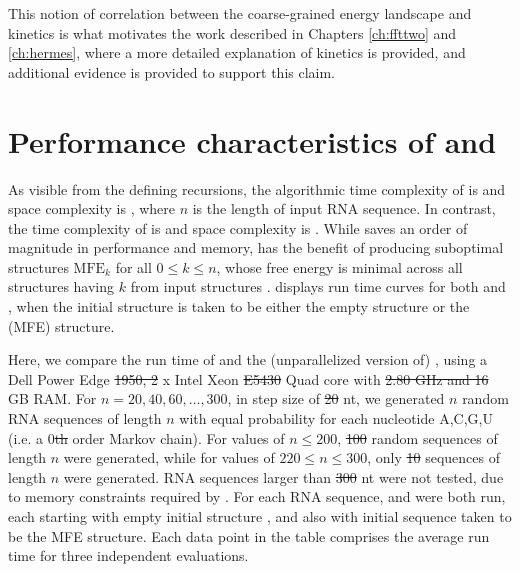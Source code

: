 \documentclass[11pt, oneside]{Thesis} %
\providecommand{\DIFadd}[1]{{\protect\color{blue}\uwave{#1}}} %
\providecommand{\DIFdel}[1]{{\protect\color{red}\sout{#1}}}                      %
\providecommand{\DIFaddbegin}{} %
\providecommand{\DIFaddend}{} %
\providecommand{\DIFdelbegin}{} %
\providecommand{\DIFdelend}{} %
\begin{document}
This notion of correlation between the coarse-grained energy landscape and
kinetics is what motivates the work described in Chapters \ref{ch:ffttwo}
and \ref{ch:hermes}, where a more detailed explanation of kinetics is provided,
and additional evidence is provided to support this claim.

\section{Performance characteristics of \fftbor and \rnabor}
\label{sec:fftbor:speed}

As visible from the defining recursions, the algorithmic time complexity of
\rnabor is  and space complexity is , where $n$ is
the length of input RNA sequence. In contrast, the time complexity of
\fftbor is  and space complexity is .
While \fftbor saves an order of magnitude in performance and memory,
\rnabor has the benefit of producing suboptimal structures $\text{MFE}_k$
for all $0 \leq k \leq n$, whose free energy is minimal across all structures
having \bpd $k$ from input structures \strSt.
 displays run time curves for both
\rnabor and \fftbor, when the initial structure \strSt is
taken to be either the empty structure or the \mfe
(MFE) structure.

Here, we compare the run time of \rnabor \citep{freyhult.b07} and
the (unparallelized version of) \fftbor, using
a Dell Power Edge \DIFdelbegin \DIFdel{1950, 2 }\DIFdelend \DIFaddbegin \DIFadd{$1950$, $2$ }\DIFaddend x Intel Xeon \DIFdelbegin \DIFdel{E5430 }\DIFdelend \DIFaddbegin \DIFadd{E$5430$ }\DIFaddend Quad
core with \DIFdelbegin \DIFdel{2.80 GHz and 16 }\DIFdelend \DIFaddbegin \DIFadd{$2.80$ GHz and $16$ }\DIFaddend GB RAM. For $n = 20,40,60,\dots,300$, in step
size of \DIFdelbegin \DIFdel{20 }\DIFdelend \DIFaddbegin \DIFadd{$20$ }\DIFaddend nt, we generated $n$ random RNA sequences of length $n$ with equal
probability for each nucleotide A,C,G,U (i.e. a \DIFdelbegin \DIFdel{$0$th }\DIFdelend \DIFaddbegin \DIFadd{0th }\DIFaddend order Markov chain).
For values of $n \leq 200$, \DIFdelbegin \DIFdel{100 }\DIFdelend \DIFaddbegin \DIFadd{$100$ }\DIFaddend random sequences of length
$n$ were generated, while for values of $220 \leq n \leq 300$, only
\DIFdelbegin \DIFdel{10 }\DIFdelend \DIFaddbegin \DIFadd{$10$ }\DIFaddend sequences of length $n$ were generated.
RNA sequences larger than \DIFdelbegin \DIFdel{300 }\DIFdelend \DIFaddbegin \DIFadd{$300$ }\DIFaddend nt were not tested,
due to  memory constraints required by \rnabor.
For each RNA sequence, \rnabor and \fftbor were both run,
each starting with empty initial structure \strSt, and also
with initial sequence \strSt taken to be the MFE structure.
Each data point in the table comprises the average run time for three
independent evaluations.
\end{document}
